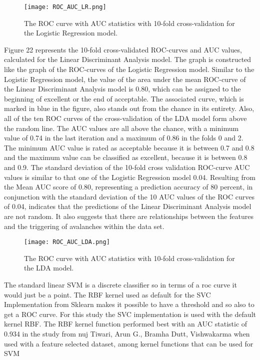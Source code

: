 \documentclass[../masterarbeit.tex]{subfiles}
\begin{document}
\begin{figure}[h]
    \centering
    \texttt{[image: ROC\_AUC\_LR.png]}
    \caption{The ROC curve with AUC statistics with 10-fold cross-validation for the Logistic Regression model.}
\end{figure}

Figure 22 represents the 10-fold cross-validated ROC-curves and AUC values, calculated for the Linear Discriminant Analysis model. The graph is constructed like the graph of the ROC-curves of the Logistic Regression model. Similar to the Logistic Regression model, the value of the area under the mean ROC-curve of the Linear Discriminant Analysis model is 0.80, which can be assigned to the beginning of excellent or the end of acceptable. The associated curve, which is marked in blue in the figure, also stands out from the chance in its entirety. Also, all of the ten ROC curves of the cross-validation of the LDA model form above the random line. The AUC values are all above the chance, with a minimum value of 0.74 in the last iteration and a maximum of 0.86 in the folds 0 and 2. The minimum AUC value is rated as acceptable because it is between 0.7 and 0.8 and the maximum value can be classified as excellent, because it is between 0.8 and 0.9. The standard deviation of the 10-fold cross validation ROC-curve AUC values is similar to that one of the Logistic Regression model 0.04. Resulting from the Mean AUC score of 0.80, representing a prediction accuracy of 80 percent, in conjunction with the standard deviation of the 10 AUC values of the ROC curves of 0.04, indicates that the predictions of the Linear Discriminant Analysis model are not random. It also suggests that there are relationships between the features and the triggering of avalanches within the data set. \\


\begin{figure}[h]
    \centering
    \texttt{[image: ROC\_AUC\_LDA.png]}
    \caption{The ROC curve with AUC statistics with 10-fold cross-validation for the LDA model.}
\end{figure}


The standard linear SVM is a discrete classifier so in terms of a roc curve it would just be a point.
The RBF kernel used as default for the SVC Implementation from Sklearn makes it possible to have a threshold and so also to get a ROC curve. For this study the SVC implementation is used with the default kernel RBF. The RBF kernel function performed best with an AUC statistic of 0.934 in the study from nuj Tiwari, Arun G., Bramha Dutt, Vishwakarma \textcite[]{Tiwari:2021} when used with a feature selected dataset, among kernel functions that can be used for SVM
\end{document}
